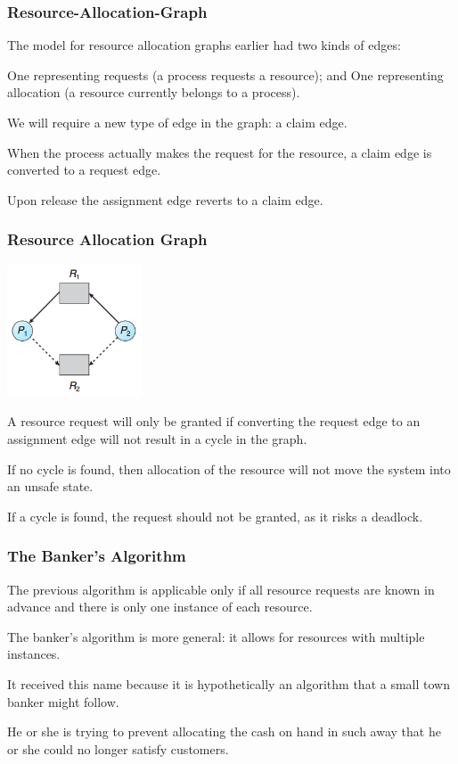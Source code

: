 \begin{frame}
\frametitle{Resource-Allocation-Graph}

The model for resource allocation graphs earlier had two kinds of edges:

One representing requests (a process requests a resource); and
One representing allocation (a resource currently belongs to a process). 

We will require a new type of edge in the graph: a \alert{claim} edge. 

When the process actually makes the request for the resource, a claim edge is converted to a request edge. 

Upon release the assignment edge reverts to a claim edge.
\end{frame}

\begin{frame}
\frametitle{Resource Allocation Graph}

\begin{center}
\includegraphics[width=0.3\textwidth]{images/resource-allocation-graph-claim.png}
\end{center}

A resource request will only be granted if converting the request edge to an assignment edge will not result in a cycle in the graph.

If no cycle is found, then allocation of the resource will not move the system into an unsafe state. 

If a cycle is found, the request should not be granted, as it risks a deadlock.

\end{frame}

\begin{frame}
\frametitle{The Banker's Algorithm}

The previous algorithm is applicable only if all resource requests are known in advance and there is only one instance of each resource.

The banker's algorithm is more general: it allows for resources with multiple instances. 

It received this name because it is hypothetically an algorithm that a small town banker might follow.

He or she is trying to prevent allocating the cash on hand in such away that he or she could no longer satisfy customers.

\end{frame}

